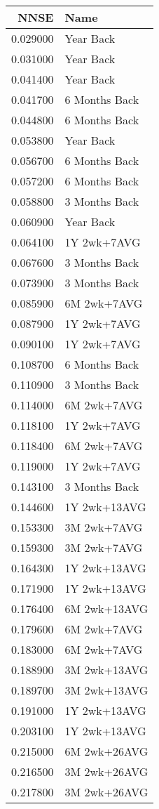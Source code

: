 \begin{tabular}{rl}
NNSE & Name \\
\hline
0.029000 & Year Back \\
0.031000 & Year Back \\
0.041400 & Year Back \\
0.041700 & 6 Months Back \\
0.044800 & 6 Months Back \\
0.053800 & Year Back \\
0.056700 & 6 Months Back \\
0.057200 & 6 Months Back \\
0.058800 & 3 Months Back \\
0.060900 & Year Back \\
0.064100 & 1Y 2wk+7AVG \\
0.067600 & 3 Months Back \\
0.073900 & 3 Months Back \\
0.085900 & 6M 2wk+7AVG \\
0.087900 & 1Y 2wk+7AVG \\
0.090100 & 1Y 2wk+7AVG \\
0.108700 & 6 Months Back \\
0.110900 & 3 Months Back \\
0.114000 & 6M 2wk+7AVG \\
0.118100 & 1Y 2wk+7AVG \\
0.118400 & 6M 2wk+7AVG \\
0.119000 & 1Y 2wk+7AVG \\
0.143100 & 3 Months Back \\
0.144600 & 1Y 2wk+13AVG \\
0.153300 & 3M 2wk+7AVG \\
0.159300 & 3M 2wk+7AVG \\
0.164300 & 1Y 2wk+13AVG \\
0.171900 & 1Y 2wk+13AVG \\
0.176400 & 6M 2wk+13AVG \\
0.179600 & 6M 2wk+7AVG \\
0.183000 & 6M 2wk+7AVG \\
0.188900 & 3M 2wk+13AVG \\
0.189700 & 3M 2wk+13AVG \\
0.191000 & 1Y 2wk+13AVG \\
0.203100 & 1Y 2wk+13AVG \\
0.215000 & 6M 2wk+26AVG \\
0.216500 & 3M 2wk+26AVG \\
0.217800 & 3M 2wk+26AVG \\

\end{tabular}

